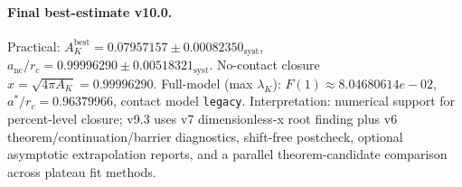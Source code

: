 \paragraph{Final best-estimate v10.0.}
Practical: $A_K^{\mathrm{best}} = 0.07957157 \pm 0.00082350_{\mathrm{syst}}$, $a_{\mathrm{nc}}/r_c = 0.99996290 \pm 0.00518321_{\mathrm{syst}}$.
No-contact closure $x = \sqrt{4\pi A_K} = 0.99996290$.
Full-model (max $\lambda_K$): $F(1) \approx 8.04680614e-02$, $a^*/r_c = 0.96379966$, contact model \texttt{legacy}.
Interpretation: numerical support for percent-level closure; v9.3 uses v7 dimensionless-x root finding plus v6 theorem/continuation/barrier diagnostics, shift-free postcheck, optional asymptotic extrapolation reports, and a parallel theorem-candidate comparison across plateau fit methods.
